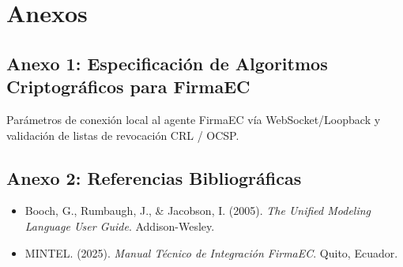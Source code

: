 \documentclass[12pt,a4paper]{article}
\begin{document}
\vspace{0.4cm}

\section{Anexos}

\subsection*{Anexo 1: Especificación de Algoritmos Criptográficos para FirmaEC}
Parámetros de conexión local al agente FirmaEC vía WebSocket/Loopback y validación de listas de revocación CRL / OCSP.

\subsection*{Anexo 2: Referencias Bibliográficas}
\begin{itemize}[leftmargin=1.5em, itemsep=2pt]
    \item Booch, G., Rumbaugh, J., \& Jacobson, I. (2005). \textit{The Unified Modeling Language User Guide}. Addison-Wesley.
    \item MINTEL. (2025). \textit{Manual Técnico de Integración FirmaEC}. Quito, Ecuador.
\end{itemize}
\end{document}
